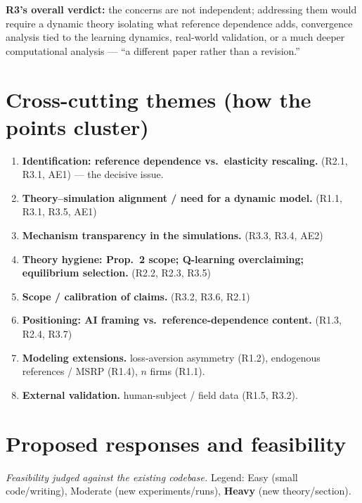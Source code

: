 \documentclass[11pt]{article}
\newcommand{\crit}[1]{\textcolor{crit}{\textbf{#1}}}
\newcommand{\med}[1]{\textcolor{med}{#1}}
\newcommand{\ok}[1]{\textcolor{ok}{#1}}
\begin{document}
\noindent\textbf{R3's overall verdict:} the concerns are not independent; addressing them would require a
dynamic theory isolating what reference dependence adds, convergence analysis tied to the learning
dynamics, real-world validation, or a much deeper computational analysis --- ``a different paper rather
than a revision.''

\section{Cross-cutting themes (how the points cluster)}

\begin{enumerate}[label=\textbf{\Alph*.}]
  \item \crit{Identification: reference dependence vs.\ elasticity rescaling.} (R2.1, R3.1, AE1)
        --- the decisive issue.
  \item \crit{Theory--simulation alignment / need for a dynamic model.} (R1.1, R3.1, R3.5, AE1)
  \item \textbf{Mechanism transparency in the simulations.} (R3.3, R3.4, AE2)
  \item \textbf{Theory hygiene: Prop.~2 scope; Q-learning overclaiming; equilibrium selection.}
        (R2.2, R2.3, R3.5)
  \item \textbf{Scope / calibration of claims.} (R3.2, R3.6, R2.1)
  \item \textbf{Positioning: AI framing vs.\ reference-dependence content.} (R1.3, R2.4, R3.7)
  \item \textbf{Modeling extensions.} loss-aversion asymmetry (R1.2), endogenous references / MSRP
        (R1.4), $n$ firms (R1.1).
  \item \textbf{External validation.} human-subject / field data (R1.5, R3.2).
\end{enumerate}

\section{Proposed responses and feasibility}

\emph{Feasibility judged against the existing codebase.} Legend:
\ok{Easy} (small code/writing), \med{Moderate} (new experiments/runs), \crit{Heavy} (new theory/section).
\end{document}
